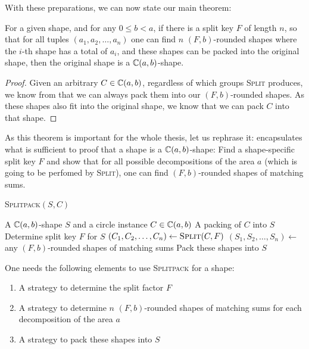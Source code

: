 \documentclass[%
    a4paper,              %
    style=screen,          %
    bibliography=totoc,   %
    nexus,                %
    lnum,                 %
    extramargin,          %
]{tubsbook}
\begin{document}
With these preparations, we can now state our main theorem:

\begin{theorem}\label{th:splitpack}
    For a given shape, and for any $0 \le b < a$, if there is a split key $F$ of length $n$, so that for all tuples $(a_1, a_2, \dots, a_n)$
    one can find $n$ $(F,b)$-rounded shapes where the $i$-th shape has a total of $a_i$, and these shapes can be packed into the original shape, then the original shape is a $\mathbb{C}(a,b)$-shape.
\end{theorem}

\begin{proof}
    Given an arbitrary $C \in \mathbb{C}(a,b)$, regardless of which groups \textsc{Split} produces, we know from  that we can always pack them into our $(F,b)$-rounded shapes. As these shapes also fit into the original shape, we know that we can pack $C$ into that shape.
\end{proof}

As this theorem is important for the whole thesis, let us rephrase it:  encapsulates what is sufficient to proof that a shape is a $\mathbb{C}(a,b)$-shape: Find a shape-specific split key $F$ and show that for all possible decompositions of the area $a$ (which is going to be perfomed by \textsc{Split}), one can find $(F,b)$-rounded shapes of matching sums.

\begin{algorithm}[htbp!]
    \caption{\textsc{Splitpack}$(S,C)$}
    \begin{algorithmic}
        \Require A $\mathbb{C}(a,b)$-shape $S$ and a circle instance $C \in \mathbb{C}(a,b)$
        \Ensure A packing of $C$ into $S$
        \State Determine split key $F$ for $S$
        \State $(C_1, C_2, \dots, C_n) \gets \textsc{Split}(C,F)$
        \State $(S_1, S_2, \dots, S_n) \gets$ any $(F,b)$-rounded shapes of matching sums
        \State Pack these shapes into $S$
            \State {}
        \EndFor
    \end{algorithmic}
\end{algorithm}

One needs the following elements to use \textsc{Splitpack} for a shape:

\begin{enumerate}
    \item A strategy to determine the split factor $F$
    \item A strategy to determine $n$ $(F,b)$-rounded shapes of matching sums for each decomposition of the area $a$
    \item A strategy to pack these shapes into $S$
\end{enumerate}
\end{document}
